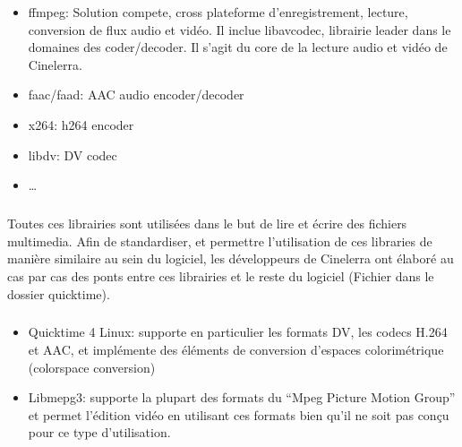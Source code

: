 \begin{itemize}

  \item{ffmpeg: Solution compete, cross plateforme
  d'enregistrement, lecture, conversion de flux audio et vidéo. Il
  inclue libavcodec, librairie leader dans le domaines des
  coder/decoder.
Il s'agit du core de la
  lecture audio et vidéo de Cinelerra.}

  \item{faac/faad: AAC audio encoder/decoder}

  \item{x264: h264 encoder}

  \item{libdv: DV codec}

  \item{\ldots}

\end{itemize}

\subparagraph{}

Toutes ces librairies sont utilisées dans le but de lire et écrire des
fichiers multimedia. Afin de standardiser, et permettre l'utilisation de
ces libraries de manière similaire au sein du logiciel, les développeurs
de Cinelerra ont élaboré au cas par cas des ponts entre ces librairies
et le reste du logiciel (Fichier dans le dossier quicktime).

\subparagraph{}

\begin{itemize}

  \item {Quicktime 4 Linux: supporte en particulier les formats DV,
    les codecs H.264 et AAC, et implémente des éléments de conversion
    d'espaces colorimétrique (colorspace conversion)}

  \item {Libmepg3: supporte la plupart des formats du ``Mpeg Picture
    Motion Group''  et permet l'édition
    vidéo en utilisant ces formats bien qu'il ne soit pas conçu pour
    ce type d'utilisation.}

\end{itemize}

